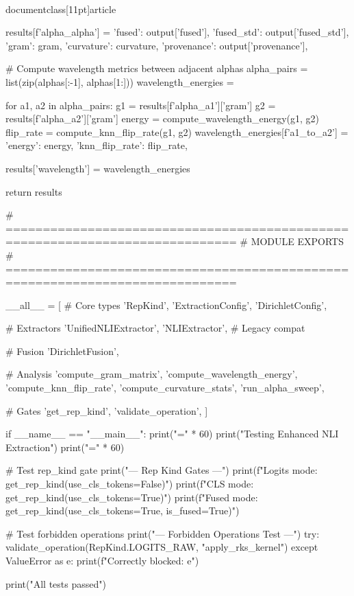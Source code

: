 \\documentclass[11pt]{article}
\begin{document}
\begin{CodeBlock}
        results[f'alpha_{alpha}'] = {
            'fused': output['fused'],
            'fused_std': output['fused_std'],
            'gram': gram,
            'curvature': curvature,
            'provenance': output['provenance'],
        }
    
    # Compute wavelength metrics between adjacent alphas
    alpha_pairs = list(zip(alphas[:-1], alphas[1:]))
    wavelength_energies = {}
    
    for a1, a2 in alpha_pairs:
        g1 = results[f'alpha_{a1}']['gram']
        g2 = results[f'alpha_{a2}']['gram']
        energy = compute_wavelength_energy(g1, g2)
        flip_rate = compute_knn_flip_rate(g1, g2)
        wavelength_energies[f'{a1}_to_{a2}'] = {
            'energy': energy,
            'knn_flip_rate': flip_rate,
        }
    
    results['wavelength'] = wavelength_energies
    
    return results


# =============================================================================
# MODULE EXPORTS
# =============================================================================

__all__ = [
    # Core types
    'RepKind',
    'ExtractionConfig',
    'DirichletConfig',
    
    # Extractors
    'UnifiedNLIExtractor',
    'NLIExtractor',  # Legacy compat
    
    # Fusion
    'DirichletFusion',
    
    # Analysis
    'compute_gram_matrix',
    'compute_wavelength_energy',
    'compute_knn_flip_rate',
    'compute_curvature_stats',
    'run_alpha_sweep',
    
    # Gates
    'get_rep_kind',
    'validate_operation',
]


if __name__ == "__main__":
    print("=" * 60)
    print("Testing Enhanced NLI Extraction")
    print("=" * 60)
    
    # Test rep_kind gate
    print("\n--- Rep Kind Gates ---")
    print(f"Logits mode: {get_rep_kind(use_cls_tokens=False)}")
    print(f"CLS mode: {get_rep_kind(use_cls_tokens=True)}")
    print(f"Fused mode: {get_rep_kind(use_cls_tokens=True, is_fused=True)}")
    
    # Test forbidden operations
    print("\n--- Forbidden Operations Test ---")
    try:
        validate_operation(RepKind.LOGITS_RAW, "apply_rks_kernel")
    except ValueError as e:
        print(f"Correctly blocked: {e}")
    
    print("\n[OK] All tests passed")
\end{CodeBlock}
\end{document}
